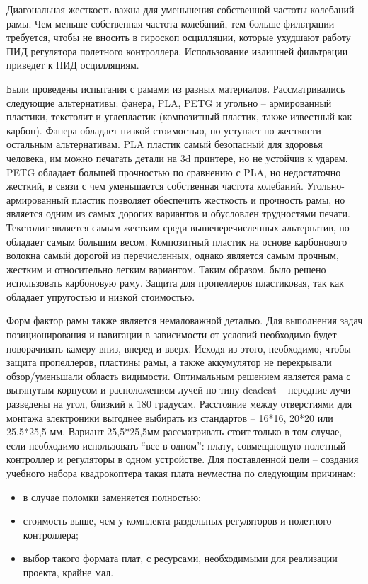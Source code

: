 Диагональная жесткость важна для уменьшения собственной частоты колебаний рамы. Чем меньше собственная частота колебаний, тем больше фильтрации требуется, чтобы не вносить в гироскоп осцилляции, которые ухудшают работу ПИД регулятора полетного контроллера. Использование излишней фильтрации приведет к ПИД осцилляциям.

Были проведены испытания с рамами из разных материалов. Рассматривались следующие альтернативы: фанера, PLA, PETG и угольно -- армированный пластики, текстолит и углепластик (композитный пластик, также известный как карбон). Фанера обладает низкой стоимостью, но уступает по жесткости остальным альтернативам. PLA пластик самый безопасный для здоровья человека, им можно печатать детали на 3d принтере, но не устойчив к ударам. PETG обладает большей прочностью по сравнению с PLA, но недостаточно жесткий, в связи с чем уменьшается собственная частота колебаний. Угольно-армированный пластик позволяет обеспечить жесткость и прочность рамы, но является одним из самых дорогих вариантов и обусловлен трудностями печати.
Текстолит является самым жестким среди вышеперечисленных альтернатив, но обладает самым большим весом. Композитный пластик на основе карбонового волокна самый дорогой из перечисленных, однако является самым прочным, жестким и относительно легким вариантом. Таким образом, было решено использовать карбоновую раму.
Защита для пропеллеров пластиковая, так как обладает упругостью и низкой стоимостью.

Форм фактор рамы также является немаловажной деталью. Для выполнения задач позиционирования и навигации в зависимости от условий необходимо будет поворачивать камеру вниз, вперед и вверх. Исходя из этого, необходимо, чтобы защита пропеллеров, пластины рамы, а также аккумулятор не перекрывали обзор/уменьшали область видимости. Оптимальным решением является рама с вытянутым корпусом и расположением лучей по типу deadcat -- передние лучи разведены на угол, близкий к 180 градусам. Расстояние между отверстиями для монтажа электроники выгоднее выбирать из стандартов -- 16*16, 20*20 или 25,5*25,5 мм. Вариант 25,5*25,5мм рассматривать стоит только в том случае, если необходимо использовать “все в одном”: плату, совмещающую полетный контроллер и регуляторы в одном устройстве. Для поставленной цели -- создания учебного набора квадрокоптера такая плата неуместна по следующим причинам:
\begin{itemize}
	\item в случае поломки заменяется полностью;
	\item стоимость выше, чем у комплекта раздельных регуляторов и полетного контроллера;
	\item выбор такого формата плат, с ресурсами, необходимыми для реализации проекта, крайне мал.
\end{itemize}

